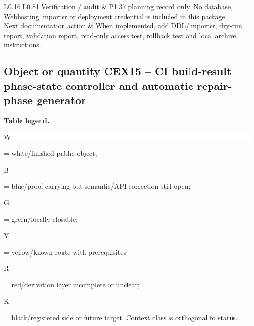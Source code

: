\begin{longtable}{L{0.16\linewidth} L{0.81\linewidth}}
\hline\addlinespace[0.20em]
Verification /\allowbreak{} audit & P1.37 planning record only. No database, Webhosting importer or deployment credential is included in this package.\\
\hline\addlinespace[0.20em]
Next documentation action & When implemented, add DDL/\allowbreak{}importer, dry-run report, validation report, read-only access test, rollback test and local archive instructions.\\
\hline\addlinespace[0.20em]
\end{longtable}
\subsection*{Object or quantity CEX15 -- CI build-result phase-state controller and automatic repair-phase generator}
\hypertarget{objproof:CEX15}{}
\par\smallskip\noindent\begin{minipage}{0.99\linewidth}\footnotesize\raggedright\textbf{Table legend.} \colorbox{white}{\strut W} = white/finished public object; \colorbox{cyan!20}{\strut B} = blue/proof-carrying but semantic/API correction still open; \colorbox{green!18}{\strut G} = green/locally closable; \colorbox{yellow!25}{\strut Y} = yellow/known route with prerequisites; \colorbox{red!20}{\strut R} = red/derivation layer incomplete or unclear; \colorbox{black!18}{\strut K} = black/registered side or future target. Context class is orthogonal to status.\end{minipage}\par\vspace{0.25em}
